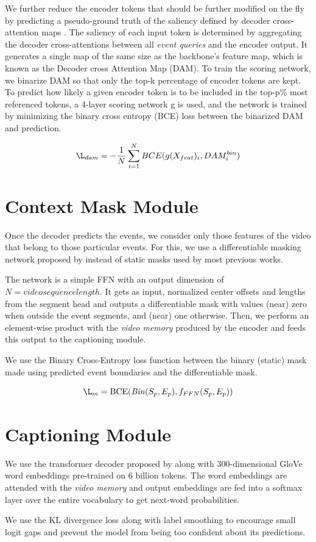 \par We further reduce the encoder tokens that should be further modified on the fly by
predicting a pseudo-ground truth of the saliency defined by decoder cross-attention maps \cite{roh2021sparse}.
The saliency of each input token is determined by aggregating the decoder cross-attentions between all \textit{event queries} and the encoder output. It generates a single map of the same size as the backbone’s feature map, which is known as the Decoder cross Attention Map (DAM). To train the scoring network, we binarize DAM so that only the top-k percentage of encoder tokens are
kept. To predict how likely a given encoder token is to be included in the top-p\% most referenced tokens, a 4-layer scoring network g is used, and the network is trained by minimizing the binary cross entropy (BCE) loss between the binarized DAM and prediction.

$$\L_{dam} = -\frac{1}{N}\displaystyle\sum\limits_{i=1}^N BCE(g(X_{feat})_i, DAM^{bin}_i)$$


\section{Context Mask Module}
\par Once the decoder predicts the events, we consider only those features of the video that belong to those particular events. For this, we use a differentiable masking network proposed by \cite{zhou2018end} instead of static masks used by most previous works.
\par The network is a simple FFN with an output dimension of $N=video sequence length$. It gets as input, normalized center offsets and lengths from the segment head and outputs a differentiable mask with values (near) zero when outside the event segments, and (near) one otherwise. Then, we perform an element-wise product with the \textit{video memory} produced by the encoder and feeds this output to the captioning module.
\par We use the Binary Cross-Entropy loss function between the binary (static) mask made using predicted event boundaries and the differentiable mask.

$$\L_{m} = \textrm{BCE}(\mathit{Bin}(S_{p}, E_{p}), f_{FFN}(S_{p}, E_{p}))$$

\section{Captioning Module}
\par We use the transformer decoder proposed by \cite{tfm} along with 300-dimensional GloVe word embeddings pre-trained on 6 billion tokens\cite{glove}. The word embeddings are attended with the \textit{video memory} and output embeddings are fed into a softmax layer over the entire vocabulary to get next-word probabilities.
\par We use the KL divergence loss along with label smoothing to encourage small logit gaps and prevent the model from being too confident about its predictions.

